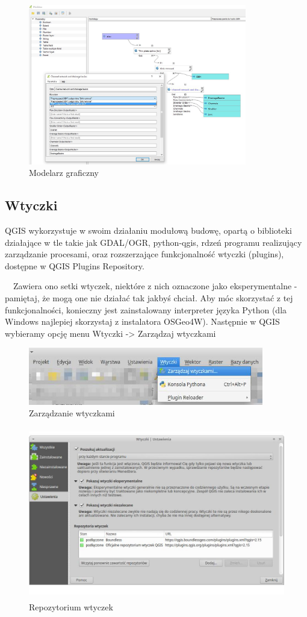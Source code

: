 \documentclass[12pt,a4paper]{book}
\begin{document}
\begin{figure}[ht]
	\centering
	\includegraphics[height=7cm]{002-modelarz.jpg}
	\caption{Modelarz graficzny}
\end{figure}
\subsection[Wtyczki]{Wtyczki}
QGIS wykorzystuje w swoim działaniu modułową budowę, opartą o biblioteki działające w tle takie jak GDAL/OGR, python-qgis, rdzeń programu realizujący zarządzanie procesami, oraz rozszerzające funkcjonalność wtyczki (plugins), dostępne w QGIS Plugins Repository.

\ \ Zawiera ono setki wtyczek, niektóre z nich oznaczone jako eksperymentalne - pamiętaj, że mogą one nie działać tak jakbyś chciał. Aby móc skorzystać z tej funkcjonalności, konieczny jest zainstalowany interpreter języka Python (dla Windows najlepiej skorzystaj z instalatora OSGeo4W). Następnie w QGIS wybieramy opcję menu Wtyczki -{\textgreater} Zarządzaj wtyczkami

\begin{figure}[ht]
	\centering
	\includegraphics[height=2.5cm]{002-wtyczki-zarzadzanie.jpg}
	\caption{Zarządzanie wtyczkami}
\end{figure}
\begin{figure}[ht]
	\centering
	\includegraphics[height=7.5cm]{002-wtyczki-repo.jpg}
	\caption{Repozytorium wtyczek}
\end{figure}
\end{document}
